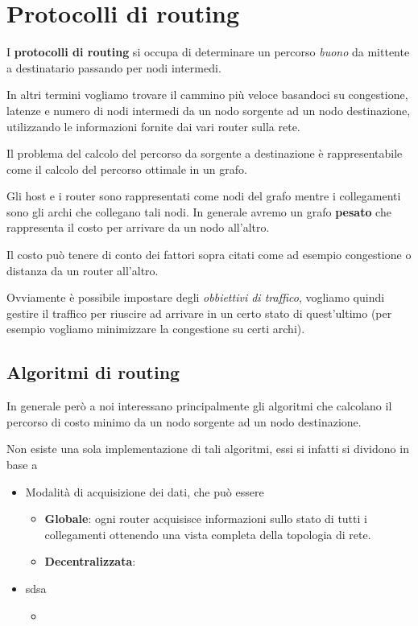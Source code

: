 \section{Protocolli di routing}
I \textbf{protocolli di routing} si occupa di determinare un percorso
\emph{buono} da mittente a destinatario passando per nodi intermedi.

In altri termini vogliamo trovare il cammino più veloce basandoci
su congestione, latenze e numero di nodi intermedi da un nodo sorgente 
ad un nodo destinazione, utilizzando le informazioni fornite dai vari
router sulla rete.

Il problema del calcolo del percorso da sorgente a destinazione è 
rappresentabile come il calcolo del percorso ottimale in un grafo.

Gli host e i router sono rappresentati come nodi del grafo mentre i
collegamenti sono gli archi che collegano tali nodi. In generale avremo
un grafo \textbf{pesato} che rappresenta il costo per arrivare da un
nodo all'altro.

Il costo può tenere di conto dei fattori sopra citati come ad esempio
congestione o distanza da un router all'altro.

Ovviamente è possibile impostare degli \emph{obbiettivi di traffico},
vogliamo quindi gestire il traffico per riuscire ad arrivare in un
certo stato di quest'ultimo (per esempio vogliamo minimizzare la 
congestione su certi archi).

\subsection{Algoritmi di routing}
In generale però a noi interessano principalmente gli algoritmi che
calcolano il percorso di costo minimo da un nodo sorgente ad un nodo
destinazione.

Non esiste una sola implementazione di tali algoritmi, essi si infatti
si dividono in base a
\begin{itemize}
	\item Modalità di acquisizione dei dati, che può essere
		\begin{itemize}
			\item \textbf{Globale}: ogni router acquisisce informazioni
				sullo stato di tutti i collegamenti ottenendo una
				vista completa della topologia di rete.
			\item \textbf{Decentralizzata}: 
		\end{itemize}
	\item sdsa
		\begin{itemize}
			\item 
		\end{itemize}
\end{itemize}
